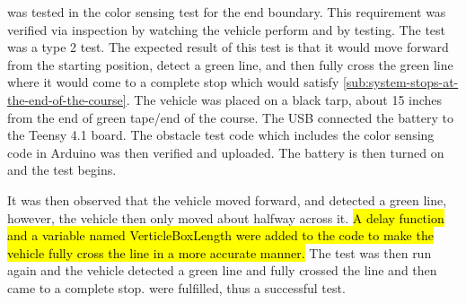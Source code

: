 \documentclass[11pt]{report}
\begin{document}
\label{tst:color-sensing-for-end-boundaries}
 was tested in the color sensing test for the end boundary. This requirement was verified via inspection by watching the vehicle perform and by testing. The test was a type 2 test. The expected result of this test is that it would move forward from the starting position, detect a green line, and then fully cross the green line where it would come to a complete stop which would satisfy \cref{sub:system-stops-at-the-end-of-the-course}. The vehicle was placed on a black tarp, about 15 inches from the end of green tape/end of the course. The USB connected the battery to the Teensy 4.1 board. The obstacle test code which includes the color sensing code in Arduino was then verified and uploaded. The battery is then turned on and the test begins.

It was then observed that the vehicle moved forward, and detected a green line, however, the vehicle then only moved about halfway across it. \hl{A delay function and a variable named VerticleBoxLength were added to the code to make the vehicle fully cross the line in a more accurate manner.} The test was then run again and the vehicle detected a green line and fully crossed the line and then came to a complete stop.  were fulfilled, thus a successful test. 
\end{document}
